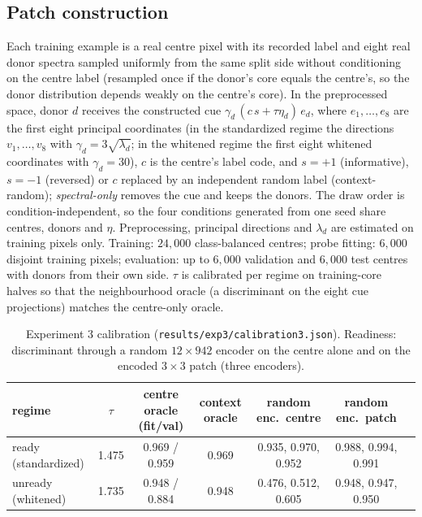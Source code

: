 \subsection{Patch construction}
Each training example is a real centre pixel with its recorded label and
eight real donor spectra sampled uniformly from the same split side without
conditioning on the centre label (resampled once if the donor's core equals
the centre's, so the donor distribution depends weakly on the centre's
core). In the preprocessed space, donor $d$ receives the constructed cue
$\gamma_d\,(c\,s+\tau\eta_d)\,e_d$, where $e_1,\dots,e_8$ are the first
eight principal coordinates (in the standardized regime the directions
$v_1,\dots,v_8$ with $\gamma_d=3\sqrt{\lambda_d}$; in the whitened regime the
first eight whitened coordinates with $\gamma_d=30$), $c$ is the centre's
label code, and $s=+1$ (informative), $s=-1$ (reversed) or $c$ replaced by an
independent random label (context-random); \emph{spectral-only} removes the
cue and keeps the donors. The draw order is condition-independent, so the
four conditions generated from one seed share centres, donors and $\eta$.
Preprocessing, principal directions and $\lambda_d$ are estimated on
training pixels only. Training: $24{,}000$ class-balanced centres; probe
fitting: $6{,}000$ disjoint training pixels; evaluation: up to $6{,}000$
validation and $6{,}000$ test centres with donors from their own side.
$\tau$ is calibrated per regime on training-core halves so that the
neighbourhood oracle (a discriminant on the eight cue projections) matches
the centre-only oracle.

\begin{table}[h]
\centering\small
\caption{Experiment 3 calibration (\texttt{results/exp3/calibration3.json}).
Readiness: discriminant through a random $12\times942$ encoder on the
centre alone and on the encoded $3\times3$ patch (three encoders).}
\label{tab:exp3_calib}
\begin{tabular}{lcccccc}
\toprule
regime & $\tau$ & centre oracle (fit/val) & context oracle & random enc.\ centre & random enc.\ patch \\
\midrule
ready (standardized) & 1.475 & 0.969 / 0.959 & 0.969 & 0.935, 0.970, 0.952 & 0.988, 0.994, 0.991 \\
unready (whitened) & 1.735 & 0.948 / 0.884 & 0.948 & 0.476, 0.512, 0.605 & 0.948, 0.947, 0.950 \\
\bottomrule
\end{tabular}
\end{table}

